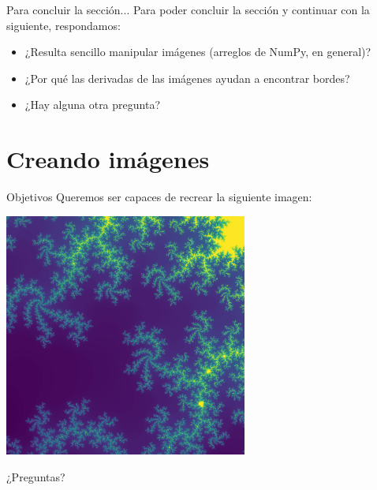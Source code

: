 \documentclass[usenames,dvipsnames]{beamer}
\begin{document}
  \begin{frame}{Para concluir la sección...}
    Para poder concluir la sección y continuar con la siguiente,
    respondamos:
    \begin{itemize}
      \item ¿Resulta sencillo manipular imágenes (arreglos de NumPy,
      en general)?
      \item ¿Por qué las derivadas de las imágenes ayudan a
      encontrar bordes?
      \item ¿Hay alguna otra pregunta?
    \end{itemize}
  \end{frame}

  \section{Creando imágenes}
  \begin{frame}{Objetivos}
    Queremos ser capaces de recrear la siguiente imagen:
    \begin{center}
      \includegraphics[width=0.6\textwidth]{imgs/mandel}\hspace{0.5cm}
    \end{center}
  \end{frame}

  \begin{frame}[standout]
    ¿Preguntas?
  \end{frame}
\end{document}
